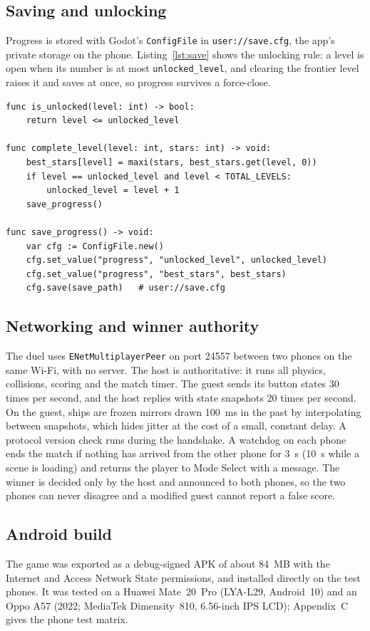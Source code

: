 \documentclass[conference]{IEEEtran}
\begin{document}
\subsection{Saving and unlocking}
Progress is stored with Godot's \texttt{ConfigFile} in \texttt{user://save.cfg}, the app's private storage on the phone. Listing~\ref{lst:save} shows the unlocking rule: a level is open when its number is at most \texttt{unlocked\_level}, and clearing the frontier level raises it and saves at once, so progress survives a force-close.

\begin{lstlisting}[caption={Unlocking and saving (\texttt{autoload/GameState.gd}).}, label={lst:save}, float=t]
func is_unlocked(level: int) -> bool:
	return level <= unlocked_level

func complete_level(level: int, stars: int) -> void:
	best_stars[level] = maxi(stars, best_stars.get(level, 0))
	if level == unlocked_level and level < TOTAL_LEVELS:
		unlocked_level = level + 1
	save_progress()

func save_progress() -> void:
	var cfg := ConfigFile.new()
	cfg.set_value("progress", "unlocked_level", unlocked_level)
	cfg.set_value("progress", "best_stars", best_stars)
	cfg.save(save_path)   # user://save.cfg
\end{lstlisting}

\subsection{Networking and winner authority}
The duel uses \texttt{ENetMultiplayerPeer} on port 24557 between two phones on the same Wi-Fi, with no server. The host is authoritative: it runs all physics, collisions, scoring and the match timer. The guest sends its button states 30 times per second, and the host replies with state snapshots 20 times per second. On the guest, ships are frozen mirrors drawn 100~ms in the past by interpolating between snapshots, which hides jitter at the cost of a small, constant delay. A protocol version check runs during the handshake. A watchdog on each phone ends the match if nothing has arrived from the other phone for 3~s (10~s while a scene is loading) and returns the player to Mode Select with a message. The winner is decided only by the host and announced to both phones, so the two phones can never disagree and a modified guest cannot report a false score.

\subsection{Android build}
The game was exported as a debug-signed APK of about 84~MB with the Internet and Access Network State permissions, and installed directly on the test phones. It was tested on a Huawei Mate~20~Pro (LYA-L29, Android~10) and an Oppo A57 (2022; MediaTek Dimensity~810, 6.56-inch IPS LCD); Appendix~C gives the phone test matrix.
\end{document}
